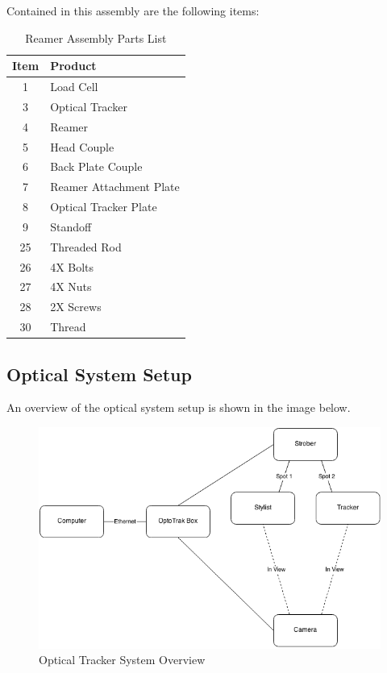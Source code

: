 \documentclass[pdftex,11pt,letterpaper]{article}
\begin{document}
Contained in this assembly are the following items: \\
\pagebreak
\begin{table}[h!]
\begin{center}
    \begin{tabular}{ | c | l |}
    \hline
    Item & Product \\ \hline
    1 & Load Cell \\ \hline
    3 & Optical Tracker \\ \hline
    4 & Reamer \\ \hline
    5 & Head Couple \\ \hline
    6 & Back Plate Couple \\ \hline
    7 & Reamer Attachment Plate \\ \hline
    8 & Optical Tracker Plate \\ \hline
    9 & Standoff \\ \hline
    25 & Threaded Rod \\ \hline
    26 & 4X Bolts \\ \hline
    27 & 4X Nuts \\ \hline
    28 & 2X Screws \\ \hline
    30 & Thread \\ \hline
	\end{tabular}
	\caption{Reamer Assembly Parts List}
\end{center}
\end{table}

\subsection{Optical System Setup}
An overview of the optical system setup is shown in the image below. \\

\begin{figure}[ht!]
\centering
\includegraphics[width=150mm]{./images/ot_overview}
\caption{Optical Tracker System Overview}
\end{figure}
\end{document}
